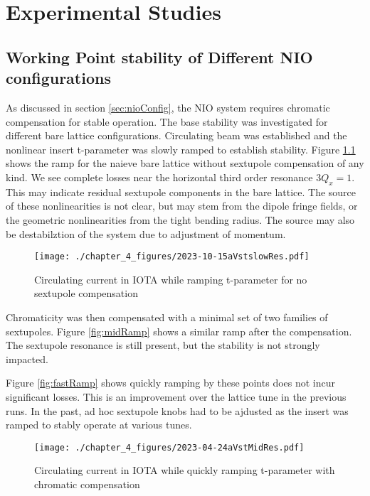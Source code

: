\chapter{Experimental Studies} \label{chap:expResults}

\section{Working Point stability of Different NIO configurations} \label{sec:nioWorkPoint}
As discussed in section \ref{sec:nioConfig}, the NIO system requires chromatic compensation for stable operation. The base stability was investigated for different bare lattice configurations. Circulating beam was established and the nonlinear insert t-parameter was slowly ramped to establish stability. Figure \ref{fig:bareRamp} shows the ramp for the naieve bare lattice without sextupole compensation of any kind. We see complete losses near the horizontal third order resonance $3 Q_x = 1$. This may indicate residual sextupole components in the bare lattice. The source of these nonlinearities is not clear, but may stem from the dipole fringe fields, or the geometric nonlinearities from the tight bending radius. The source may also be destabilztion of the system due to adjustment of momentum.

\begin{figure}
	\centering
	\texttt{[image: ./chapter\_4\_figures/2023-10-15aVstslowRes.pdf]}
	\caption{Circulating current in IOTA while ramping t-parameter for no sextupole compensation}
	\label{fig:bareRamp}
\end{figure}


Chromaticity was then compensated with a minimal set of two families of sextupoles. Figure \ref{fig:midRamp} shows a similar ramp after the compensation. The sextupole resonance is still present, but the stability is not strongly impacted.

Figure \ref{fig:fastRamp} shows quickly ramping by these points does not incur significant losses. This is an improvement over the lattice tune in the previous runs. In the past, ad hoc sextupole knobs had to be ajdusted as the insert was ramped to stably operate at various tunes.

\begin{figure}
	\centering
	\texttt{[image: ./chapter\_4\_figures/2023-04-24aVstMidRes.pdf]}
	\caption{Circulating current in IOTA while quickly ramping t-parameter with chromatic compensation}
	\label{fig:fasteRamp}
\end{figure}

